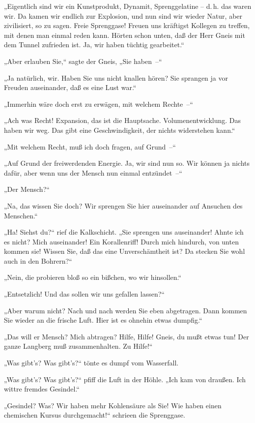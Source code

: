 „Eigentlich sind wir ein Kunstprodukt, Dynamit, Sprenggelatine –
d.\,h. das waren wir. Da kamen wir endlich zur Explosion, und nun
sind wir wieder Natur, aber zivilisiert, so zu sagen. Freie
Sprenggase! Freuen uns kräftigst Kollegen zu treffen, mit denen man
einmal reden kann. Hörten schon unten, daß der Herr Gneis mit dem
Tunnel zufrieden ist. Ja, wir haben tüchtig gearbeitet.“

„Aber erlauben Sie,“ sagte der Gneis, „Sie haben~–“

„Ja natürlich, wir. Haben Sie uns nicht knallen hören? Sie sprangen
ja vor Freuden auseinander, daß es eine Lust war.“

„Immerhin wäre doch erst zu erwägen, mit welchem Rechte~–“

„Ach was Recht! Expansion, das ist die Hauptsache.
Volumenentwicklung. Das haben wir weg. Das gibt eine
Geschwindigkeit, der nichts widerstehen kann.“

„Mit welchem Recht, muß ich doch fragen, auf Grund~–“

„Auf Grund der freiwerdenden Energie. Ja, wir sind nun so. Wir
können ja nichts dafür, aber wenn uns der Mensch nun einmal
entzündet~–“

„Der Mensch?“

„Na, das wissen Sie doch? Wir sprengen Sie hier auseinander auf
Ansuchen des Menschen.“

„Ha! Siehst du?“ rief die Kalkschicht. „Sie sprengen uns
auseinander! Ahnte ich es nicht? Mich auseinander! Ein
Korallenriff! Durch mich hindurch, von unten kommen sie! Wissen
Sie, daß das eine Unverschämtheit ist? Da stecken Sie wohl auch in
den Bohrern?“

„Nein, die probieren bloß so ein bißchen, wo wir hinsollen.“

„Entsetzlich! Und das sollen wir uns gefallen lassen?“

„Aber warum nicht? Nach und nach werden Sie eben abgetragen. Dann
kommen Sie wieder an die frische Luft. Hier ist es ohnehin etwas
dumpfig.“

„Das will er Mensch? Mich abtragen? Hilfe, Hilfe! Gneis, du mußt
etwas tun! Der ganze Langberg muß zusammenhalten. Zu Hilfe!“

„Was gibt's? Was gibt's?“ tönte es dumpf vom Wasserfall.

„Was gibt's? Was gibt's?“ pfiff die Luft in der Höhle. „Ich kam von
draußen. Ich wittre fremdes Gesindel.“

„Gesindel? Was? Wir haben mehr Kohlensäure als Sie! Wie haben einen
chemischen Kursus durchgemacht!“ schrieen die Sprenggase.

